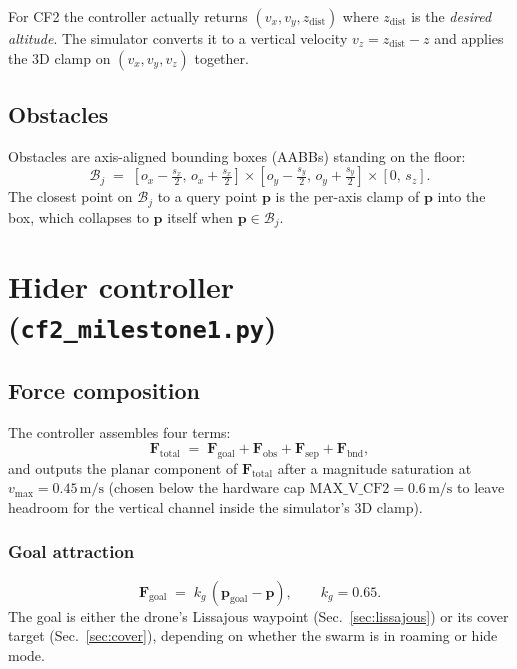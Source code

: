\documentclass[11pt,a4paper]{article}
\newcommand{\code}[1]{\texttt{#1}}
\newcommand{\vect}[1]{\mathbf{#1}}
\begin{document}
For CF2 the controller actually returns $(v_x, v_y, z_\mathrm{dist})$ where
$z_\mathrm{dist}$ is the \emph{desired altitude}. The simulator converts it to
a vertical velocity $v_z = z_\mathrm{dist} - z$ and applies the 3D clamp on
$(v_x, v_y, v_z)$ together.

\subsection{Obstacles}

Obstacles are axis-aligned bounding boxes (AABBs) standing on the floor:
\[
    \mathcal{B}_j \;=\; [o_x - \tfrac{s_x}{2},\, o_x + \tfrac{s_x}{2}]
                       \times[o_y - \tfrac{s_y}{2},\, o_y + \tfrac{s_y}{2}]
                       \times[0,\, s_z].
\]
The closest point on $\mathcal{B}_j$ to a query point $\vect{p}$ is the per-axis
clamp of $\vect{p}$ into the box, which collapses to $\vect{p}$ itself when
$\vect{p} \in \mathcal{B}_j$.

\section{Hider controller (\code{cf2\_milestone1.py})}

\subsection{Force composition}

The controller assembles four terms:
\[
    \vect{F}_\mathrm{total}
    \;=\; \vect{F}_\mathrm{goal}
        + \vect{F}_\mathrm{obs}
        + \vect{F}_\mathrm{sep}
        + \vect{F}_\mathrm{bnd},
\]
and outputs the planar component of $\vect{F}_\mathrm{total}$ after a
magnitude saturation at $v_\mathrm{max} = 0.45\,\text{m/s}$ (chosen below the
hardware cap $\text{MAX\_V\_CF2} = 0.6\,\text{m/s}$ to leave headroom for the
vertical channel inside the simulator's 3D clamp).

\subsubsection*{Goal attraction}
\[
    \vect{F}_\mathrm{goal} \;=\; k_g \,(\vect{p}_\mathrm{goal} - \vect{p}),
    \qquad k_g = 0.65.
\]
The goal is either the drone's Lissajous waypoint (Sec.~\ref{sec:lissajous})
or its cover target (Sec.~\ref{sec:cover}), depending on whether the swarm is
in roaming or hide mode.
\end{document}
